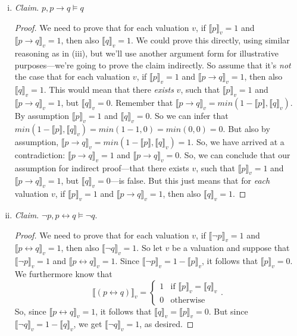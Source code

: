\begin{enumerate}[\thesection.1]
\begin{enumerate}[(i)]
			\item \emph{Claim}. $p,p\to q\vDash q$
			
			\begin{proof}
			We need to prove that for each valuation $v$, if $\llbracket p\rrbracket_v=1$ and $\llbracket p\to q\rrbracket_v=1$, then also $\llbracket q\rrbracket_v=1$. We could prove this directly, using similar reasoning as in (iii), but we'll use another argument form for illustrative purposes---we're going to prove the claim indirectly. So assume that it's \emph{not} the case that for each valuation $v$, if $\llbracket p\rrbracket_v=1$ and $\llbracket p\to q\rrbracket_v=1$, then also $\llbracket q\rrbracket_v=1$. This would mean that there \emph{exists} $v$, such that  $\llbracket p\rrbracket_v=1$ and $\llbracket p\to q\rrbracket_v=1$, but $\llbracket q\rrbracket_v=0$. Remember that $\llbracket p\to q\rrbracket_v=min(1-\llbracket p\rrbracket, \llbracket q\rrbracket_v)$. By assumption $\llbracket p\rrbracket_v=1$ and $\llbracket q\rrbracket_v=0$. So we can infer that $min(1-\llbracket p\rrbracket, \llbracket q\rrbracket_v)=min(1-1, 0)=min(0, 0)=0$. But also by assumption, $\llbracket p\to q\rrbracket_v=min(1-\llbracket p\rrbracket, \llbracket q\rrbracket_v)=1$. So, we have arrived at a contradiction: $\llbracket p\to q\rrbracket_v=1$ and $\llbracket p\to q\rrbracket_v=0$. So, we can conclude that our assumption for indirect proof---that there exists $v$, such that  $\llbracket p\rrbracket_v=1$ and $\llbracket p\to q\rrbracket_v=1$, but $\llbracket q\rrbracket_v=0$---is false. But this just means that for \emph{each} valuation $v$, if $\llbracket p\rrbracket_v=1$ and $\llbracket p\to q\rrbracket_v=1$, then also $\llbracket q\rrbracket_v=1$.
			
			\end{proof}
			
			\item \emph{Claim}. $\neg p, p\leftrightarrow q\vDash \neg q$. 
			\begin{proof}
			  We need to prove that for each valuation $v$,
			  if
			  $\llbracket \neg p\rrbracket_v=1$
			  and
			  $\llbracket p\leftrightarrow q\rrbracket_v=1$,
			  then also
			  $\llbracket \neg q\rrbracket_v=1$.
			  So let $v$ be a valuation and suppose that
			  $\llbracket \neg p\rrbracket_v=1$
			  and
			  $\llbracket p\leftrightarrow q\rrbracket_v=1$.
			  Since
			  $\llbracket \neg p\rrbracket_v=1-\llbracket p\rrbracket_v$,
			  it follows that
			  $\llbracket p\rrbracket_v=0$.
			  We furthermore know that \[\llbracket(p\leftrightarrow q)\rrbracket_v=\begin{cases} 1 & \text{if } \llbracket p\rrbracket_v=\llbracket q\rrbracket_v\\0&\text{otherwise}\end{cases}.\]
			  So,
			  since
			  $\llbracket p\leftrightarrow q\rrbracket_v=1$,
			  it follows that
			  $\llbracket q\rrbracket_v=\llbracket p\rrbracket_v=0$.
			  But since
			  $\llbracket \neg q\rrbracket_v=1-\llbracket q\rrbracket_v$,
			  we get
			  $\llbracket \neg q\rrbracket_v=1$,
			  as desired.
			

\end{proof}
\end{enumerate}
\end{enumerate}

